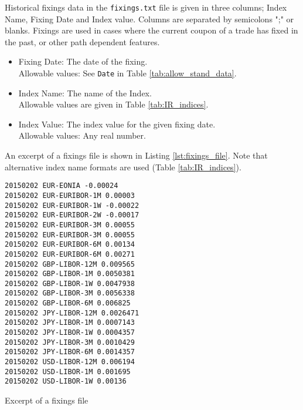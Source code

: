 Historical fixings data in the {\tt fixings.txt} file is given in
three columns;  Index Name,  Fixing Date and  Index value. Columns are
separated by semicolons ";" or blanks. Fixings are used in cases where the current coupon of a trade has fixed in the past, or other path dependent features.

\begin{itemize}

\item Fixing Date: The date of the fixing.  \\ Allowable values:  See \lstinline!Date! in Table \ref{tab:allow_stand_data}.

\item Index Name: The name of the Index. \\Allowable values are given
  in Table \ref{tab:IR_indices}. %

\item Index Value: The index value for the given fixing date. \\Allowable values: Any real number.
\end{itemize}

An excerpt of a fixings file is shown in Listing \ref{lst:fixings_file}. Note that alternative index name formats are used (Table \ref{tab:IR_indices}).

\begin{listing}[H]
\begin{verbatim}
20150202 EUR-EONIA -0.00024
20150202 EUR-EURIBOR-1M 0.00003
20150202 EUR-EURIBOR-1W -0.00022
20150202 EUR-EURIBOR-2W -0.00017
20150202 EUR-EURIBOR-3M 0.00055
20150202 EUR-EURIBOR-3M 0.00055
20150202 EUR-EURIBOR-6M 0.00134
20150202 EUR-EURIBOR-6M 0.00271
20150202 GBP-LIBOR-12M 0.009565
20150202 GBP-LIBOR-1M 0.0050381
20150202 GBP-LIBOR-1W 0.0047938
20150202 GBP-LIBOR-3M 0.0056338
20150202 GBP-LIBOR-6M 0.006825
20150202 JPY-LIBOR-12M 0.0026471
20150202 JPY-LIBOR-1M 0.0007143
20150202 JPY-LIBOR-1W 0.0004357
20150202 JPY-LIBOR-3M 0.0010429
20150202 JPY-LIBOR-6M 0.0014357
20150202 USD-LIBOR-12M 0.006194
20150202 USD-LIBOR-1M 0.001695
20150202 USD-LIBOR-1W 0.00136
\end{verbatim}
\caption{Excerpt of a fixings file}
\label{lst:fixings_file}  
\end{listing}

